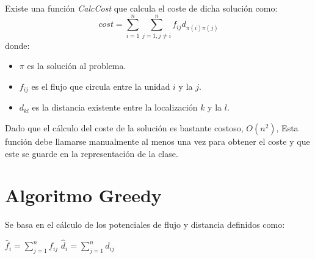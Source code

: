 \documentclass[a4paper, 12pt]{article}
\begin{document}
   Existe una función \textit{CalcCost} que calcula el coste de dicha solución como:
      $$cost = \sum_{i=1}^{n}\sum_{j=1, j \neq i}^{n} f_{ij}d_{\pi(i)\pi(j)}$$
   donde:
   \begin{itemize}
      \item $\pi$ es la solución al problema.
      
      \item $f_{ij}$ es el flujo que circula entre la unidad $i$ y la $j$.
      
      \item $d_{kl}$ es la distancia existente entre la localización $k$ y la $l$.
   \end{itemize}\vspace*{0.5cm}
   
   Dado que el cálculo del coste de la solución es bastante costoso, $O(n^{2})$, Esta función debe llamarse manualmente al menos una vez para obtener el coste y que este se guarde en la representación de la clase.
   
   
   \newpage
   \section{Algoritmo Greedy}
   Se basa en el cálculo de los potenciales de flujo y distancia definidos como:
   \begin{center}
      $\hat{f}_i = \sum_{j=1}^{n}f_{ij}$ \hspace*{1cm} $\hat{d}_i = \sum_{j=1}^{n}d_{ij}$
   \end{center}
   
\end{document}
